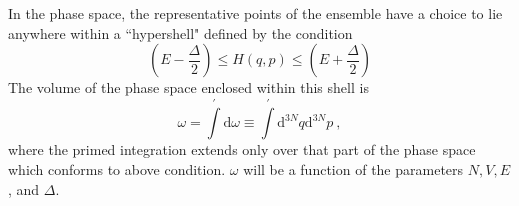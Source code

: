 \documentclass[12pt,a4paper]{article}
\newcommand{\dif}{\mathrm{d}}
\begin{document}
In the phase space, the representative points of the ensemble have a choice to lie anywhere within a ``hypershell" defined by the condition
\begin{equation}
\left(E -\frac{\Delta}{2} \right) \leqslant H(q, p) \leqslant \left(E +\frac{\Delta}{2} \right)
\end{equation}
The volume of the phase space enclosed within this shell is
\begin{equation}
\omega = \int\limits^\prime \dif \omega \equiv \int\limits^\prime  \dif^{3N} q \dif^{3N} p ~,
\end{equation}
where the primed integration extends only over that part of the phase space which conforms to above condition. $\omega$ will be a function of the parameters $N, V, E$, and $\Delta$.






































\end{document}
